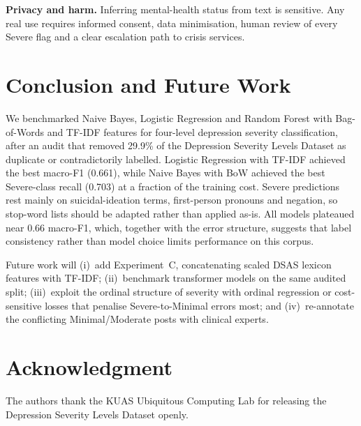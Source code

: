 \documentclass[conference]{IEEEtran}
\begin{document}
\textbf{Privacy and harm.} Inferring mental-health status from text is sensitive. Any real use requires informed consent, data minimisation, human review of every Severe flag and a clear escalation path to crisis services.

\section{Conclusion and Future Work}

We benchmarked Naive Bayes, Logistic Regression and Random Forest with Bag-of-Words and TF-IDF features for four-level depression severity classification, after an audit that removed 29.9\% of the Depression Severity Levels Dataset as duplicate or contradictorily labelled. Logistic Regression with TF-IDF achieved the best macro-F1 (0.661), while Naive Bayes with BoW achieved the best Severe-class recall (0.703) at a fraction of the training cost. Severe predictions rest mainly on suicidal-ideation terms, first-person pronouns and negation, so stop-word lists should be adapted rather than applied as-is. All models plateaued near 0.66 macro-F1, which, together with the error structure, suggests that label consistency rather than model choice limits performance on this corpus.

Future work will (i)~add Experiment~C, concatenating scaled DSAS lexicon features with TF-IDF; (ii)~benchmark transformer models on the same audited split; (iii)~exploit the ordinal structure of severity with ordinal regression or cost-sensitive losses that penalise Severe-to-Minimal errors most; and (iv)~re-annotate the conflicting Minimal/Moderate posts with clinical experts.

\section*{Acknowledgment}
The authors thank the KUAS Ubiquitous Computing Lab for releasing the Depression Severity Levels Dataset openly.



\end{document}
